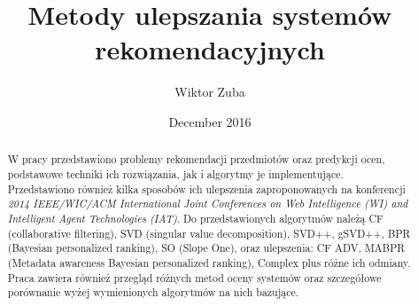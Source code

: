 \documentclass{pracamgr}
\author{Wiktor Zuba}
\title{Metody ulepszania systemów rekomendacyjnych}
\date{December 2016}
\begin{document}
\maketitle

\begin{abstract}
 W pracy przedstawiono problemy rekomendacji przedmiotów oraz predykcji ocen, podstawowe techniki ich rozwiązania, jak i algorytmy je implementujące.
 Przedstawiono również kilka sposobów ich ulepszenia zaproponowanych na konferencji
 \textit{2014 IEEE/WIC/ACM International Joint Conferences on Web Intelligence (WI) and Intelligent Agent Technologies (IAT)}.
 Do przedstawionych algorytmów należą CF (collaborative filtering), SVD (singular value decomposition), SVD++, gSVD++,
 BPR (Bayesian personalized ranking), SO (Slope One), oraz ulepszenia: CF ADV, MABPR (Metadata awareness Bayesian personalized ranking),
 Complex plus różne ich odmiany.
 Praca zawiera również przegląd różnych metod oceny systemów oraz szczegółowe porównanie wyżej wymienionych algorytmów na nich bazujące.
\end{abstract}


\tableofcontents

\end{document}
